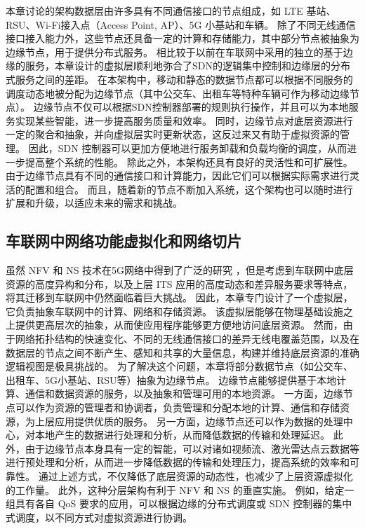 本章讨论的架构数据层由许多具有不同通信接口的节点组成，如 LTE 基站、RSU、Wi-Fi接入点（Access Point, AP）、5G 小基站和车辆。
除了不同无线通信接口接入能力外，这些节点还具备一定的计算和存储能力，其中部分节点被抽象为边缘节点，用于提供分布式服务。
相比较于以前在车联网中采用的独立的基于边缘的服务，本章设计的虚拟层顺利地弥合了SDN的逻辑集中控制和边缘层的分布式服务之间的差距。
在本架构中，移动和静态的数据节点都可以根据不同服务的调度动态地被分配为边缘节点（其中公交车、出租车等特种车辆可作为移动边缘节点）。
边缘节点不仅可以根据SDN控制器部署的规则执行操作，并且可以为本地服务实现某些智能，进一步提高服务质量和效率。
同时，边缘节点对底层资源进行一定的聚合和抽象，并向虚拟层实时更新状态，这反过来又有助于虚拟资源的管理。
因此，SDN 控制器可以更加方便地进行服务卸载和负载均衡的调度，从而进一步提高整个系统的性能。
除此之外，本架构还具有良好的灵活性和可扩展性。
由于边缘节点具有不同的通信接口和计算能力，因此它们可以根据实际需求进行灵活的配置和组合。
而且，随着新的节点不断加入系统，这个架构也可以随时进行扩展和升级，以适应未来的需求和挑战。

\subsection{车联网中网络功能虚拟化和网络切片}
虽然 NFV 和 NS 技术在5G网络中得到了广泛的研究 \cite{zhu2021wang}，但是考虑到车联网中底层资源的高度异构和分布，以及上层 ITS 应用的高度动态和差异服务要求等特点，将其迁移到车联网中仍然面临着巨大挑战。
因此，本章专门设计了一个虚拟层，它负责抽象车联网中的计算、网络和存储资源。
该虚拟层能够在物理基础设施之上提供更高层次的抽象，从而使应用程序能够更方便地访问底层资源。
然而，由于网络拓扑结构的快速变化、不同的无线通信接口的差异无线电覆盖范围，以及在数据层的节点之间不断产生、感知和共享的大量信息，构建并维持底层资源的准确逻辑视图是极具挑战的。
为了解决这个问题，本章将部分数据节点（如公交车、出租车、5G小基站、RSU等）抽象为边缘节点。
边缘节点能够提供基于本地计算、通信和数据资源的服务，以及抽象和管理可用的本地资源。
一方面，边缘节点可以作为资源的管理者和协调者，负责管理和分配本地的计算、通信和存储资源，为上层应用提供优质的服务。
另一方面，边缘节点还可以作为数据的处理中心，对本地产生的数据进行处理和分析，从而降低数据的传输和处理延迟。
此外，由于边缘节点本身具有一定的智能，可以对诸如视频流、激光雷达点云数据等进行预处理和分析，从而进一步降低数据的传输和处理压力，提高系统的效率和可靠性。
通过上述方式，不仅降低了底层资源的动态性，也减少了上层资源虚拟化的工作量。
此外，这种分层架构有利于 NFV 和 NS 的垂直实施。
例如，给定一组具有各自 QoS 要求的应用，可以根据边缘的分布式调度或 SDN 控制器的集中式调度，以不同方式对虚拟资源进行协调。

